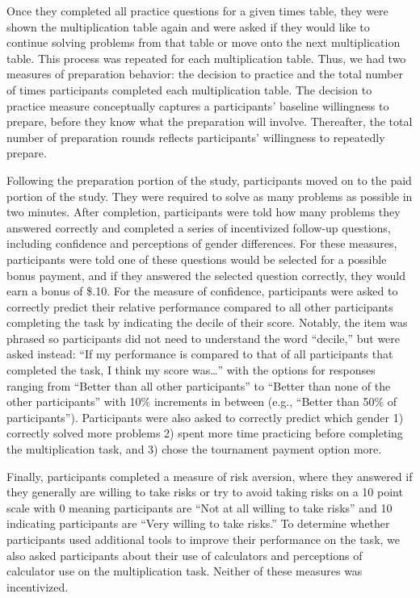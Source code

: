 \documentclass[a4paper, nobind]{templates/ociamthesis}
\begin{document}
Once they completed all practice questions for a given times table, they were shown the multiplication table again and were asked if they would like to continue solving problems from that table or move onto the next multiplication table. This process was repeated for each multiplication table. Thus, we had two measures of preparation behavior: the decision to practice and the total number of times participants completed each multiplication table. The decision to practice measure conceptually captures a participants' baseline willingness to prepare, before they know what the preparation will involve. Thereafter, the total number of preparation rounds reflects participants' willingness to repeatedly prepare.

Following the preparation portion of the study, participants moved on to the paid portion of the study. They were required to solve as many problems as possible in two minutes. After completion, participants were told how many problems they answered correctly and completed a series of incentivized follow-up questions, including confidence and perceptions of gender differences. For these measures, participants were told one of these questions would be selected for a possible bonus payment, and if they answered the selected question correctly, they would earn a bonus of \$.10. For the measure of confidence, participants were asked to correctly predict their relative performance compared to all other participants completing the task by indicating the decile of their score. Notably, the item was phrased so participants did not need to understand the word ``decile,'' but were asked instead: ``If my performance is compared to that of all participants that completed the task, I think my score was\ldots{}'' with the options for responses ranging from ``Better than all other participants'' to ``Better than none of the other participants'' with 10\% increments in between (e.g., ``Better than 50\% of participants''). Participants were also asked to correctly predict which gender 1) correctly solved more problems 2) spent more time practicing before completing the multiplication task, and 3) chose the tournament payment option more.

Finally, participants completed a measure of risk aversion, where they answered if they generally are willing to take risks or try to avoid taking risks \autocite{Dohmen2011} on a 10 point scale with 0 meaning participants are ``Not at all willing to take risks'' and 10 indicating participants are ``Very willing to take risks.'' To determine whether participants used additional tools to improve their performance on the task, we also asked participants about their use of calculators and perceptions of calculator use on the multiplication task. Neither of these measures was incentivized.
\end{document}
